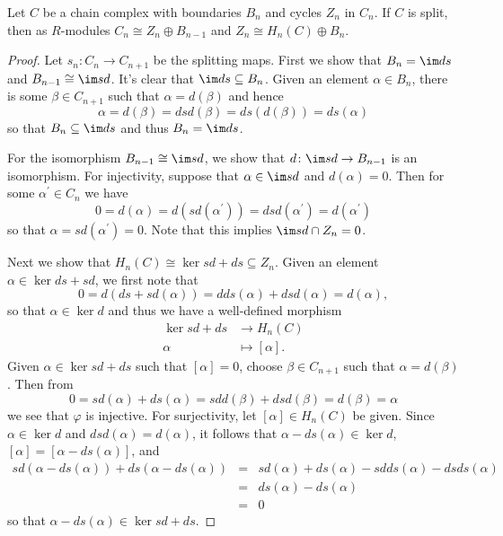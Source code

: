 \documentclass[10pt]{amsart}
\begin{document}
\begin{lem}\label{lem5}
  Let $C$ be a chain complex with boundaries $B_n$ and cycles $Z_n$ in $C_n$.
  If $C$ is split, then as $R$-modules $C_n \cong Z_n \oplus B_{n-1}$ and $Z_n \cong H_n(C) \oplus B_n$.

  \begin{proof}
    Let $s_n : C_n \rightarrow C_{n+1}$ be the splitting maps.
    First we show that $B_n = \im ds$ and $B_{n-1} \cong \im sd$.
    It's clear that $\im ds \subseteq B_n$.
    Given an element $\alpha \in B_n$, there is some $\beta \in C_{n+1}$ such that $\alpha = d(\beta)$ and hence
    $$\alpha = d(\beta) = dsd(\beta) = ds(d(\beta))= ds(\alpha)$$
    so that $B_n \subseteq \im ds$ and thus $B_n = \im ds$.

    For the isomorphism $B_{n-1} \cong \im sd$, we show that $d \colon \im sd \rightarrow B_{n-1}$ is an isomorphism.
    For injectivity, suppose that $\alpha \in \im sd$ and $d(\alpha) = 0$.
    Then for some $\alpha^\prime \in C_n$ we have
    $$0 = d(\alpha) = d(sd(\alpha^\prime)) = dsd(\alpha^\prime) = d(\alpha^\prime)$$
    so that $\alpha = sd(\alpha^\prime) = 0$.
    Note that this implies $\im sd \cap Z_n = 0$.

    Next we show that $H_n(C) \cong \ker sd + ds \subseteq Z_n$.
    Given an element $\alpha \in \ker ds + sd$, we first note that
    $$0 = d(ds + sd(\alpha)) = dds(\alpha) + dsd(\alpha) = d(\alpha),$$
    so that $\alpha \in \ker d$ and thus we have a well-defined morphism
    \begin{align*}
      \ker sd + ds & \rightarrow H_n(C)\\
      \alpha &\mapsto [\alpha].
    \end{align*}
    Given $\alpha \in \ker sd + ds$ such that $[\alpha] = 0$, choose $\beta \in C_{n+1}$ such that $\alpha = d(\beta)$.
    Then from
    $$0 = sd(\alpha) + ds(\alpha) = sdd(\beta) + dsd(\beta) = d(\beta) = \alpha$$
    we see that $\varphi$ is injective.
    For surjectivity, let $[\alpha] \in H_n(C)$ be given.
    Since $\alpha \in \ker d$ and $dsd(\alpha) = d(\alpha)$, it follows that $\alpha - ds(\alpha) \in \ker d$, $[\alpha] = [\alpha - ds(\alpha)]$, and 
    \begin{eqnarray*}
      sd(\alpha - ds(\alpha)) + ds(\alpha - ds(\alpha)) &=& sd(\alpha) + ds(\alpha) - sdds(\alpha) - dsds(\alpha)\\
      &=& ds(\alpha) - ds(\alpha)\\
      &=& 0
    \end{eqnarray*}
    so that $\alpha - ds(\alpha) \in \ker sd + ds$.


\end{proof}
\end{lem}
\end{document}
